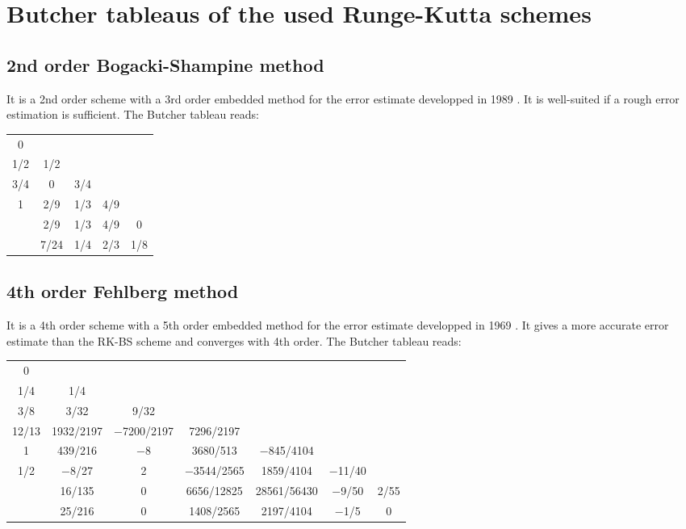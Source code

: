 	
\chapter{Butcher tableaus of the used Runge-Kutta schemes}
\label{apx:ButcherTableaus}

\section{2nd order Bogacki-Shampine method}
It is a 2nd order scheme with a 3rd order embedded method for the error estimate developped in 1989 \cite{RK-BogackiShampine}. It is well-suited if a rough error estimation is sufficient. The Butcher tableau reads:
\begin{center}
	\begin{tabular}{c | c c c c}
		0 & & & & \\
		1/2 & 1/2 & & & \\
		3/4 & 0 & 3/4 & & \\
		1 & 2/9 & 1/3 & 4/9 & \\ \hline
		& 2/9 & 1/3 & 4/9 & 0 \\
		& 7/24 & 1/4 & 2/3 & 1/8
	\end{tabular}
\end{center}

\section{4th order Fehlberg method}
It is a 4th order scheme with a 5th order embedded method for the error estimate developped in 1969 \cite{RK-Fehlberg}. It gives a more accurate error estimate than the RK-BS scheme and converges with 4th order. The Butcher tableau reads:

\begin{center}
	\begin{tabular}{c | c c c c c c}
		0 & & & & & & \\
		1/4 & 1/4 & & & & & \\
		3/8 & 3/32 & 9/32 & & & &\\
		12/13 & 1932/2197 &	−7200/2197 & 7296/2197 & & & \\
		1 & 439/216 & −8 & 3680/513 & −845/4104 & & \\
		1/2 & −8/27 & 2 & −3544/2565 & 1859/4104 & −11/40 	& \\ \hline
		& 16/135 & 0 & 6656/12825 & 28561/56430 & −9/50 & 2/55 \\ 
		& 25/216 & 0 & 1408/2565 & 2197/4104 & −1/5 & 0 
	\end{tabular}
\end{center}


